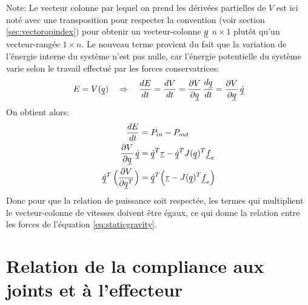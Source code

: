 Note: Le vecteur colonne par lequel on prend les dérivées partielles de $V$ est ici noté avec une transposition pour respecter la convention (voir section \ref{sec:vectoropindex}) pour obtenir un vecteur-colonne $\underline{g}$ $n \times 1$ plutôt qu’un vecteur-rangée $1 \times n$. Le nouveau terme provient du fait que la variation de l'énergie interne du système n'est pas nulle, car l'énergie potentielle du système varie selon le travail effectué par les forces conservatrices:
\begin{align}
	E = V( \underline{q} ) \quad \Rightarrow \quad \frac{dE}{dt} = \frac{dV}{dt} = \frac{\partial V}{ \partial \underline{q}} \, \frac{d \underline{q}}{dt} = \frac{\partial V}{ \partial \underline{q}} \, \underline{\dot{q}}
\end{align}
On obtient alors:
\begin{align}
	\frac{dE}{dt} &= P_{in} - P_{out} \\
	\frac{\partial V}{ \partial \underline{q}} \, \underline{\dot{q}} &=  \underline{\dot{q}}^T \underline{\tau} - \underline{\dot{q}}^T  J( \underline{q})^T \underline{f}_e  \\
	\underline{\dot{q}}^T  \, \Big(  \frac{\partial V}{ \partial \underline{q}^T} \Big) &=  \underline{\dot{q}}^T  \Big(\underline{\tau} -  J( \underline{q})^T \underline{f}_e  \Big)
\end{align}
Donc pour que la relation de puissance soit respectée, les termes qui multiplient le vecteur-colonne de vitesses doivent être égaux, ce qui donne la relation entre les forces de l'équation \eqref{eq:staticgravity}.




\section{Relation de la compliance aux joints et à l'effecteur}
\label{sec:manipcompliance}

